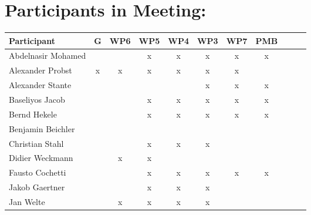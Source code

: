 \documentclass[a4paper, 11pt]{article}
\begin{document}
\section{Participants in Meeting:}

\begin{tabular}{|l|c|c|c|c||c|c|c||c|c|c|}
\hline
\textbf{Participant}  & \textbf{G} & \textbf{WP6} &  \textbf{WP5} & \textbf{WP4}&  \textbf{WP3} & \textbf{WP7}&  \textbf{PMB} \\\hline
Abdelnasir Mohamed    &   &   & x & x & x & x & x \\\hline 
Alexander Probst     & x & x & x & x & x & x &   \\\hline  
Alexander Stante     &   &   &   &   & x & x & x \\\hline 
Baseliyos Jacob      &   &   & x & x & x & x & x \\\hline 
Bernd Hekele         &   &   & x & x & x & x & x \\\hline
Benjamin Beichler    &   &   &   &   &   &   &   \\\hline
Christian Stahl      &   &   & x & x & x &   &   \\\hline
Didier Weckmann      &   & x & x &   &   &   &   \\\hline
Fausto Cochetti      &   &   & x & x & x & x & x \\\hline
Jakob Gaertner       &   &   & x & x & x &   &   \\\hline
Jan Welte            &   & x & x & x & x &   &   \\\hline

\end{tabular}
\end{document}
